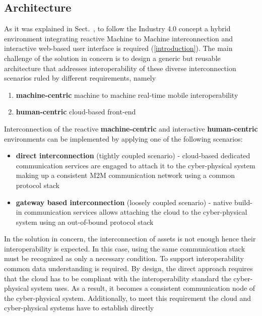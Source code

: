 \documentclass{jacsart}
\providecommand{\tightlist} { \setlength{\itemsep}{0pt}\setlength{\parskip}{0pt}}
\begin{document}
\hypertarget{architecture}{%
  \subsection{Architecture}\label{architecture}}

As it was explained in Sect.~, to follow the Industry 4.0 concept a hybrid environment integrating reactive Machine to Machine interconnection and interactive web-based user interface is required (\ref*{introduction}). The main challenge of the solution in concern is to design a generic but reusable architecture that addresses interoperability of these diverse interconnection scenarios ruled by different requirements, namely

\begin{enumerate}
  \def\labelenumi{\arabic{enumi}.}
  \tightlist
  \item
        \textbf{machine-centric} machine to machine real-time mobile
        interoperability
  \item
        \textbf{human-centric} cloud-based front-end
\end{enumerate}

Interconnection of the reactive \textbf{machine-centric} and interactive \textbf{human-centric} environments can be implemented by applying one of the following scenarios:

\begin{itemize}
  \item \textbf{direct interconnection} (tightly coupled scenario) - cloud-based dedicated communication services are engaged to attach it to the cyber-physical system making up a consistent M2M communication network using a common protocol stack
  \item \textbf{gateway based interconnection} (loosely coupled scenario) - native build-in communication services allows attaching the cloud to the cyber-physical system using an out-of-bound protocol stack
\end{itemize}

In the solution in concern, the interconnection of assets is not enough hence their interoperability is expected. In this case, using the same communication stack must be recognized as only a necessary condition. To support interoperability common data understanding is required. By design, the direct approach requires that the cloud has to be compliant
with the interoperability standard the cyber-physical system uses. As a result, it becomes a consistent communication node of the cyber-physical system. Additionally, to meet this requirement the cloud and cyber-physical systems have to establish directly
\end{document}

